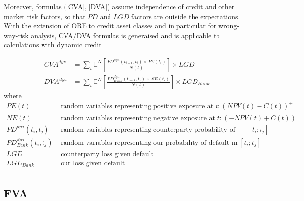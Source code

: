 \documentclass[12pt, a4paper]{article}
\newcommand\E{\ensuremath{\mathbb{E}}}
\newcommand{\CVA}{\mathit{CVA}}
\newcommand{\DVA}{\mathit{DVA}}
\newcommand{\PE}{\mathit{PE}}
\newcommand{\NE}{\mathit{NE}}
\newcommand{\PD}{\mathit{PD}}
\newcommand{\LGD}{\mathit{LGD}}
\begin{document}
{\begin{appendix}
Moreover, formulas (\ref{CVA}, \ref{DVA}) assume independence of credit and other market risk factors, so that $\PD$ and
$\LGD$ factors are outside the expectations. With the extension of ORE to credit asset classes and in particular for
wrong-way-risk analysis, CVA/DVA formulas is generaised and is applicable to calculations with dynamic credit

\begin{align}
\CVA^{dyn} &= \sum_{i} \E^N\left[\frac{\PD^{dyn}(t_{i-1},t_i)\times \PE(t_i)}{N(t)} \right]\times\LGD \label{CVA_dynamic} \\
\DVA^{dyn} &= \sum_{i} \E^N\left[\frac{\PD^{dyn}_{Bank}(t_{i-1},t_i)\times \NE(t_i)}{N(t)} \right]\times\LGD_{Bank} \label{DVA_dynamic}
\end{align}
where
\begin{align*}
\PE(t) & \mbox{ random variables representing positive exposure at } t: (NPV(t)-C(t))^+\\
\NE(t) & \mbox{ random variables representing negative exposure at } t: (-NPV(t)+C(t))^+\\
PD^{dyn}(t_i,t_j) & \mbox{ random variables representing counterparty probability of default in } [t_i;t_j]\\
PD^{dyn}_{Bank}(t_i,t_j) & \mbox{ random variables representing our probability of default in } [t_i;t_j]\\
LGD & \mbox{ counterparty loss given default}\\
LGD_{Bank} & \mbox{ our loss given default}\\
\end{align*}

\subsection{FVA}\label{sec:fva}


\end{appendix}}
\end{document}
